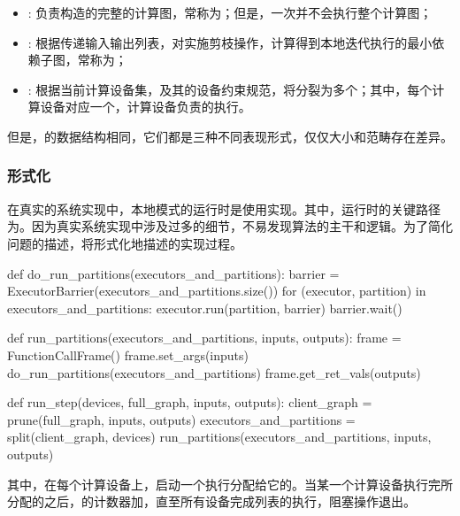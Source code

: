 \begin{content}
\begin{itemize}
  \item {}: 负责构造的完整的计算图，常称为；但是，一次并不会执行整个计算图；
  \item {}: 根据传递输入输出列表，对实施剪枝操作，计算得到本地迭代执行的最小依赖子图，常称为；
  \item {}: 根据当前计算设备集，及其的设备约束规范，将分裂为多个；其中，每个计算设备对应一个，计算设备负责的执行。
\end{itemize}

但是，的数据结构相同，它们都是三种不同表现形式，仅仅大小和范畴存在差异。

\subsubsection{形式化}

在真实的系统实现中，本地模式的运行时是使用实现。其中，\tf{}运行时的关键路径为。因为真实系统实现中涉及过多的细节，不易发现算法的主干和逻辑。为了简化问题的描述，将形式化地描述的实现过程。

\begin{leftbar}
\begin{python}
def do_run_partitions(executors_and_partitions):
  barrier = ExecutorBarrier(executors_and_partitions.size())
  for (executor, partition) in executors_and_partitions:
    executor.run(partition, barrier)  
  barrier.wait()

def run_partitions(executors_and_partitions, inputs, outputs):
  frame = FunctionCallFrame()
  frame.set_args(inputs)
  do_run_partitions(executors_and_partitions)
  frame.get_ret_vals(outputs)

def run_step(devices, full_graph, inputs, outputs):
  client_graph = prune(full_graph, inputs, outputs)
  executors_and_partitions = split(client_graph, devices)
  run_partitions(executors_and_partitions, inputs, outputs)
\end{python}
\end{leftbar}

其中，在每个计算设备上，启动一个执行分配给它的。当某一个计算设备执行完所分配的之后，的计数器加，直至所有设备完成列表的执行，阻塞操作退出。


\end{content}
